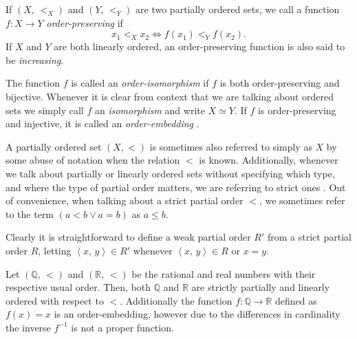 \documentclass[../../main.tex]{subfiles}
\begin{document}
\begin{definition}\cite[p.13]{Jec78}
    If $\left(X,\, <_X\right)$ and $\left(Y,\, <_Y\right)$ are two partially ordered sets, we call a function $f: X \to Y$ \textit{order-preserving} if
    $$x_1 <_X x_2 \iff f(x_1) <_Y f(x_2).$$
    If $X$ and $Y$ are both linearly ordered, an order-preserving function is also said to be \textit{increasing}.

    The function $f$ is called an \textit{order-isomorphism} if $f$ is both order-preserving and bijective.
    Whenever it is clear from context that we are talking about ordered sets we simply call $f$ an \textit{isomorphism} and write $X \simeq Y$.
    If $f$ is order-preserving and injective, it is called an \textit{order-embedding} \cite[p.167]{Gol17}.
\end{definition}

A partially ordered set $(X, <)$ is sometimes also referred to simply as $X$ by some abuse of notation when the relation $<$ is known.
Additionally, whenever we talk about partially or linearly ordered sets without specifying which type, and where the type of partial order matters, we are referring to strict ones \cite[p.12]{Jec78}.
Out of convenience, when talking about a strict partial order $<$, we sometimes refer to the term $\left(a < b \vee a = b\right)$ as $a \leq b$.

Clearly it is straightforward to define a weak partial order $R'$ from a strict partial order $R$, letting $\left<x,\, y\right> \in R'$ whenever $\left<x,\, y\right> \in R$ or $x = y$.

\begin{example}
        Let $(\mathbb{Q},\, <)$ and $(\mathbb{R},\, <)$ be the rational and real numbers with their respective usual order.
        Then, both $\mathbb{Q}$ and $\mathbb{R}$ are strictly partially and linearly ordered with respect to $<$.
        Additionally the function $f: \mathbb{Q} \to \mathbb{R}$ defined as $f(x) = x$ is an order-embedding, 
        however due to the differences in cardinality the inverse $f^{-1}$ is not a proper function.
\end{example}
\end{document}
